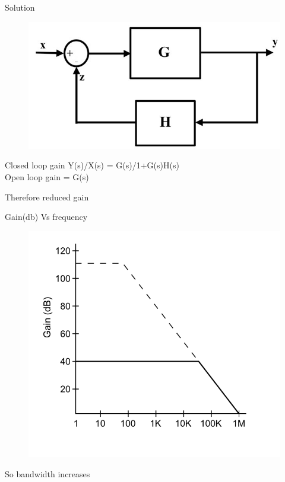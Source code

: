 \documentclass{beamer}
\begin{document}
\begin{frame}{Solution}

\begin{figure}
    \includegraphics[scale=0.3]{plot.jpg}
\end{figure}
Closed loop gain Y(s)/X(s) = G(s)/1+G(s)H(s) \\
Open loop gain = G(s)


Therefore reduced gain

\end{frame}



\begin{frame}
Gain(db) Vs frequency \\

\begin{figure}
    \includegraphics[scale=0.35]{plot2.png}
\end{figure}

So bandwidth increases


\end{frame}
\end{document}
